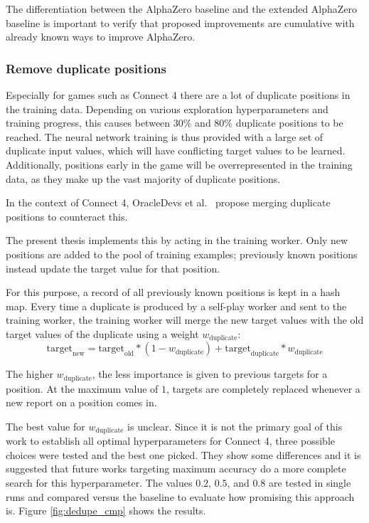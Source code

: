 \documentclass[12pt,onecolumn,oneside,titlepage]{article}
\begin{document}
The differentiation between the AlphaZero baseline and the extended AlphaZero baseline is important to verify that proposed improvements are cumulative with already known ways to improve AlphaZero.


\subsubsection{Remove duplicate positions}

Especially for games such as Connect 4 there are a lot of duplicate positions in the training data. Depending on various exploration hyperparameters and training progress, this causes between $30\%$ and $80\%$ duplicate positions to be reached.
The neural network training is thus provided with a large set of duplicate input values, which will have conflicting target values to be learned. Additionally, positions early in the game will 
be overrepresented in the training data, as they make up the vast majority of duplicate positions.

In the context of Connect 4, OracleDevs et al.\ \cite{oracledevs6} propose merging duplicate positions to counteract this.

The present thesis implements this by acting in the training worker. Only new positions are added to the pool of training examples; previously known positions instead update the target value
for that position.

For this purpose, a record of all previously known positions is kept in a hash map.
Every time a duplicate is produced by a self-play worker and sent to the training worker, the training worker will merge the new target values with the old target values of the duplicate using a weight
$w_{\text{duplicate}}$: $$\text{target}_{\text{new}} = \text{target}_{\text{old}} * (1 - w_{\text{duplicate}}) + \text{target}_{\text{duplicate}} * w_{\text{duplicate}}$$

The higher $w_{\text{duplicate}}$, the less importance is given to previous targets for a position. At the maximum value of $1$,
targets are completely replaced whenever a new report on a position comes in.

The best value for $w_{\text{duplicate}}$ is unclear. Since it is not the primary goal of this work to establish all optimal hyperparameters for Connect 4, three possible choices were tested and the best one picked. 
They show some differences and it is suggested that future
works targeting maximum accuracy do a more complete search for this hyperparameter.
The values $0.2$, $0.5$, and $0.8$ are tested in single runs and compared versus the baseline to evaluate how promising this approach is. Figure \ref{fig:dedupe_cmp} shows the results. 
\end{document}
